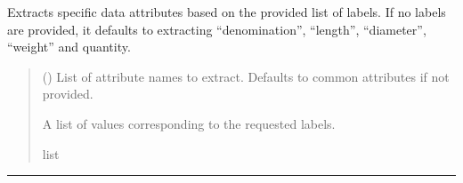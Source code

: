 \documentclass[a4paper,10pt,english]{sphinxmanual}
\begin{document}
\begin{fulllineitems}
\begin{fulllineitems}
\label{\detokenize{API:etacad.stirrup.Stirrup.extract_data}}
\pysigstartsignatures
{}
\pysigstopsignatures
\sphinxAtStartPar
Extracts specific data attributes based on the provided list of labels.
If no labels are provided, it defaults to extracting “denomination”, “length”, “diameter”, “weight” and
quantity.
\begin{quote}\begin{description}
\sphinxAtStartPar
{} (\sphinxstyleliteralemphasis{\sphinxupquote{{[}}}\sphinxstyleliteralemphasis{\sphinxupquote{{]}}}\sphinxstyleliteralemphasis{\sphinxupquote{, }}) \textendash{} List of attribute names to extract. Defaults to common attributes if not provided.

\sphinxAtStartPar
A list of values corresponding to the requested labels.

\sphinxAtStartPar
list

\end{description}\end{quote}

\end{fulllineitems}


\end{fulllineitems}



\bigskip\hrule\bigskip

\label{\detokenize{API:module-etacad.concrete}}
\end{document}
